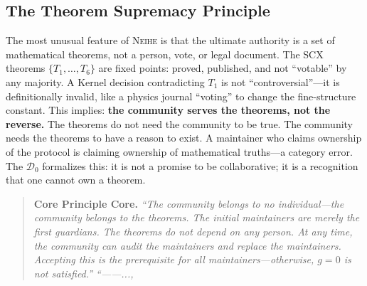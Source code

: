 \documentclass[12pt,a4paper]{article}
\theoremstyle{definition}
\newcommand{\Neihe}{\textsc{Neihe}}
\newcommand{\gzero}{g=0}
\newcommand{\GzeroDecl}{\mathcal{D}_{0}}
\begin{document}
\subsection{The Theorem Supremacy Principle}
The most unusual feature of \Neihe{} is that the ultimate authority is a set of mathematical theorems, not a person, vote, or legal document. The SCX theorems $\{T_1, \ldots, T_6\}$ are fixed points: proved, published, and not ``votable'' by any majority. A Kernel decision contradicting $T_1$ is not ``controversial''---it is definitionally invalid, like a physics journal ``voting'' to change the fine-structure constant.
This implies: \textbf{the community serves the theorems, not the reverse.} The theorems do not need the community to be true. The community needs the theorems to have a reason to exist. A maintainer who claims ownership of the protocol is claiming ownership of mathematical truths---a category error. The $\GzeroDecl$ formalizes this: it is not a promise to be collaborative; it is a recognition that one cannot own a theorem.
\begin{quote}
\textbf{Core Principle Core.} \textit{``The community belongs to no individual---the community belongs to the theorems. The initial maintainers are merely the first guardians. The theorems do not depend on any person. At any time, the community can audit the maintainers and replace the maintainers. Accepting this is the prerequisite for all maintainers---otherwise, $\gzero$ is not satisfied.''}
\medskip
\textit{``——...,}
\end{quote}
\end{document}
